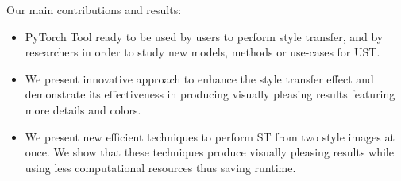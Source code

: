 Our main contributions and results:
\begin{itemize}
	\item PyTorch Tool ready to be used by users to perform style transfer, and by researchers in order to study new models, methods or use-cases for UST.
	\item We present innovative approach to enhance the style transfer effect and demonstrate its effectiveness in producing visually pleasing results featuring more details and colors.
	\item We present new efficient techniques to perform ST from two style images at once. We show that these techniques produce visually pleasing results while using less computational resources thus saving runtime. 
\end{itemize}




